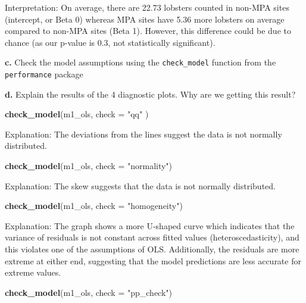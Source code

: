 \documentclass[
]{article}
\newenvironment{Shaded}{\begin{snugshade}}{\end{snugshade}}
\newcommand{\AttributeTok}[1]{\textcolor[rgb]{0.13,0.29,0.53}{#1}}
\newcommand{\FunctionTok}[1]{\textcolor[rgb]{0.13,0.29,0.53}{\textbf{#1}}}
\newcommand{\NormalTok}[1]{#1}
\newcommand{\StringTok}[1]{\textcolor[rgb]{0.31,0.60,0.02}{#1}}
\begin{document}
Interpretation: On average, there are 22.73 lobsters counted in non-MPA
sites (intercept, or Beta 0) whereas MPA sites have 5.36 more lobsters
on average compared to non-MPA sites (Beta 1). However, this difference
could be due to chance (as our p-value is 0.3, not statistically
significant).

\textbf{c.} Check the model assumptions using the \texttt{check\_model}
function from the \texttt{performance} package

\textbf{d.} Explain the results of the 4 diagnostic plots. Why are we
getting this result?

\begin{Shaded}
\begin{Highlighting}[]
\FunctionTok{check\_model}\NormalTok{(m1\_ols,  }\AttributeTok{check =} \StringTok{"qq"}\NormalTok{ )}
\end{Highlighting}
\end{Shaded}

Explanation: The deviations from the lines suggest the data is not
normally distributed.

\begin{Shaded}
\begin{Highlighting}[]
\FunctionTok{check\_model}\NormalTok{(m1\_ols, }\AttributeTok{check =} \StringTok{"normality"}\NormalTok{)}
\end{Highlighting}
\end{Shaded}

Explanation: The skew suggests that the data is not normally
distributed.

\begin{Shaded}
\begin{Highlighting}[]
\FunctionTok{check\_model}\NormalTok{(m1\_ols, }\AttributeTok{check =} \StringTok{"homogeneity"}\NormalTok{)}
\end{Highlighting}
\end{Shaded}

Explanation: The graph shows a more U-shaped curve which indicates that
the variance of residuals is not constant across fitted values
(heteroscedasticity), and this violates one of the assumptions of OLS.
Additionally, the residuals are more extreme at either end, suggesting
that the model predictions are less accurate for extreme values.

\begin{Shaded}
\begin{Highlighting}[]
\FunctionTok{check\_model}\NormalTok{(m1\_ols, }\AttributeTok{check =} \StringTok{"pp\_check"}\NormalTok{)}
\end{Highlighting}
\end{Shaded}
\end{document}
